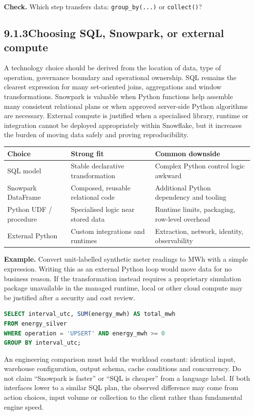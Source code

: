 \documentclass[11pt,twoside]{article}
\newcommand{\topic}[2]{\subsection*{#1\quad #2}}
\begin{document}
\textbf{Check.} Which step transfers data: \texttt{group\_by(...)} or \texttt{collect()}?
\newpage
\topic{9.1.3}{Choosing SQL, Snowpark, or external compute}
A technology choice should be derived from the location of data, type of operation, governance boundary and operational ownership. SQL remains the clearest expression for many set-oriented joins, aggregations and window transformations. Snowpark is valuable when Python functions help assemble many consistent relational plans or when approved server-side Python algorithms are necessary. External compute is justified when a specialised library, runtime or integration cannot be deployed appropriately within Snowflake, but it increases the burden of moving data safely and proving reproducibility.
\begin{center}\renewcommand{\arraystretch}{1.09}\begin{tabularx}{\linewidth}{@{}p{26mm}X X@{}}\toprule
\textbf{Choice}&\textbf{Strong fit}&\textbf{Common downside}\\\midrule
SQL model&Stable declarative transformation&Complex Python control logic awkward\\
Snowpark DataFrame&Composed, reusable relational code&Additional Python dependency and tooling\\
Python UDF / procedure&Specialised logic near stored data&Runtime limits, packaging, row-level overhead\\
External Python&Custom integrations and runtimes&Extraction, network, identity, observability\\\bottomrule
\end{tabularx}\end{center}
\textbf{Example.} Convert unit-labelled synthetic meter readings to MWh with a simple expression. Writing this as an external Python loop would move data for no business reason. If the transformation instead requires a proprietary simulation package unavailable in the managed runtime, local or other cloud compute may be justified after a security and cost review.
\begin{lstlisting}[language=SQL,caption={A readable SQL baseline for equivalent Snowpark logic.}]
SELECT interval_utc, SUM(energy_mwh) AS total_mwh
FROM energy_silver
WHERE operation = 'UPSERT' AND energy_mwh >= 0
GROUP BY interval_utc;
\end{lstlisting}
An engineering comparison must hold the workload constant: identical input, warehouse configuration, output schema, cache conditions and concurrency. Do not claim ``Snowpark is faster'' or ``SQL is cheaper'' from a language label. If both interfaces lower to a similar SQL plan, the observed difference may come from action choices, input volume or collection to the client rather than fundamental engine speed.
\end{document}
